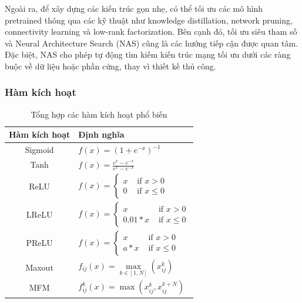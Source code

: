 Ngoài ra, để xây dựng các kiến trúc gọn nhẹ, có thể tối ưu các mô hình pretrained thông qua các kỹ thuật như knowledge distillation, network pruning, connectivity learning và low-rank factorization. Bên cạnh đó, tối ưu siêu tham số và Neural Architecture Search (NAS) cũng là các hướng tiếp cận được quan tâm. Đặc biệt, NAS cho phép tự động tìm kiếm kiến trúc mạng tối ưu dưới các ràng buộc về dữ liệu hoặc phần cứng, thay vì thiết kế thủ công\cite{14_10.1145/3776588}.
\subsubsection{Hàm kích hoạt}
\begin{table}[]
     \small
    \centering
    \begin{tabular}{|c|l|}
        \hline
        \textbf{Hàm kích hoạt} & \textbf{Định nghĩa}  \\
        \hline
        Sigmoid & $f(x) = (1+e^{-x})^{-1}$\\
        Tanh &    $f(x) = \frac{e^{x}-e^{-x}}{e^{x}-e^{-x}}$\\
        ReLU & $\displaystyle f(x) = \left\{ 
                  \begin{aligned}
                    x & \text{ if } x > 0 \\
                    0 & \text{ if } x \leq 0
                  \end{aligned} 
                    \right.$ \\ 
        LReLU\cite{LReLU_Maas2013RectifierNI} & $\displaystyle f(x) = \left\{ 
                  \begin{aligned}
                    x & \text{ if } x > 0 \\
                    0.01 * x & \text{ if } x \leq 0
                  \end{aligned} 
                    \right.$ \\ 
        PReLU\cite{PRELU_7410480} & $\displaystyle f(x) = \left\{ 
                  \begin{aligned}
                    x & \text{ if } x > 0 \\
                    a * x & \text{ if } x \leq 0
                  \end{aligned} 
                    \right. $ \\
        Maxout\cite{ACT_pmlr-v28-goodfellow13} & $f_{ij}(x) = \max\limits_{k\in [1,N]}(x^k_{ij})$\\
        MFM\cite{40_8353856} & $f_{ij}^k(x) = \max (x^k_{ij},x^{k+N}_{ij})$\\
        \hline
    \end{tabular}
    \caption{Tổng hợp các hàm kích hoạt phổ biến}
    \label{tab:activation_table}
\end{table}

